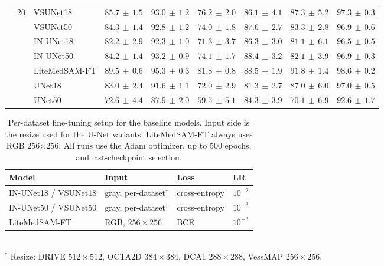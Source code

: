 \documentclass[twocolumn]{article}
\begin{document}
\begin{table}[t]
\begin{tabular}{l c l r r r r r r}
\cline{2-9}
 & \multirow{7}{*}{20} & VSUNet18 & $85.7 \,\pm\, 1.5$ & $93.0 \,\pm\, 1.2$ & $76.2 \,\pm\, 2.0$ & $86.1 \,\pm\, 4.1$ & $87.3 \,\pm\, 5.2$ & $97.3 \,\pm\, 0.3$ \\
 &  & VSUNet50 & $84.3 \,\pm\, 1.4$ & $92.8 \,\pm\, 1.2$ & $74.0 \,\pm\, 1.8$ & $87.6 \,\pm\, 2.7$ & $83.3 \,\pm\, 2.8$ & $96.9 \,\pm\, 0.6$ \\
 &  & IN-UNet18 & $82.2 \,\pm\, 2.9$ & $92.3 \,\pm\, 1.0$ & $71.3 \,\pm\, 3.7$ & $86.3 \,\pm\, 3.0$ & $81.1 \,\pm\, 6.1$ & $96.5 \,\pm\, 0.5$ \\
 &  & IN-UNet50 & $84.2 \,\pm\, 1.4$ & $93.2 \,\pm\, 0.9$ & $74.1 \,\pm\, 1.7$ & $88.4 \,\pm\, 3.2$ & $82.1 \,\pm\, 3.9$ & $96.9 \,\pm\, 0.3$ \\
 &  & LiteMedSAM-FT & $\mathbf{89.5} \,\pm\, 0.6$ & $95.3 \,\pm\, 0.3$ & $81.8 \,\pm\, 0.8$ & $88.5 \,\pm\, 1.9$ & $91.8 \,\pm\, 1.4$ & $98.6 \,\pm\, 0.2$ \\
 &  & UNet18 & $83.0 \,\pm\, 2.4$ & $91.6 \,\pm\, 1.1$ & $72.0 \,\pm\, 2.9$ & $81.3 \,\pm\, 2.7$ & $87.0 \,\pm\, 6.0$ & $97.0 \,\pm\, 0.5$ \\
 &  & UNet50 & $72.6 \,\pm\, 4.4$ & $87.9 \,\pm\, 2.0$ & $59.5 \,\pm\, 5.1$ & $84.3 \,\pm\, 3.9$ & $70.1 \,\pm\, 6.9$ & $92.6 \,\pm\, 1.7$ \\
\hline
\end{tabular}
    \endgroup
\end{table}


\begin{table}[t]
    \caption{Per-dataset fine-tuning setup for the baseline models. Input side is the resize used for the U-Net variants; LiteMedSAM-FT always uses RGB 256$\times$256. All runs use the Adam optimizer, up to 500 epochs, and last-checkpoint selection.}
    \label{tab:finetune_hparams}
    \centering
    \begingroup
    \small
    \setlength{\tabcolsep}{5pt}
    \renewcommand{\arraystretch}{1.15}
    \begin{tabular}{l l l l}
        \hline
        \textbf{Model} & \textbf{Input} & \textbf{Loss} & \textbf{LR} \\
        \hline
        IN-UNet18 / VSUNet18 & gray, per-dataset$^{\dagger}$ & cross-entropy & $10^{-2}$ \\
        IN-UNet50 / VSUNet50 & gray, per-dataset$^{\dagger}$ & cross-entropy & $10^{-3}$ \\
        LiteMedSAM-FT & RGB, $256{\times}256$ & BCE & $10^{-3}$ \\
        \hline
    \end{tabular}
    \endgroup
    \\[2pt]
    {\footnotesize $^{\dagger}$ Resize: DRIVE $512{\times}512$, OCTA2D $384{\times}384$, DCA1 $288{\times}288$, VessMAP $256{\times}256$.}
\end{table}
\end{document}
